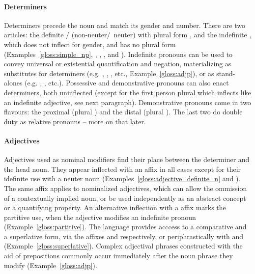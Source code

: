 \paragraph{Determiners}
Determiners precede the noun and match its gender and number.
There are two articles: the definite / (non-neuter/~neuter) with plural form , and the indefinite , which does not inflect for gender, and has no plural form (Examples~\ref{gloss:simple_np}, , , ,  and ).
Indefinite pronouns can be used to convey universal or existential quantification and negation, materializing as substitutes for determiners (e.g. , , , etc., Example~\ref{gloss:adjp}), or as stand-alones (e.g. , , etc.).
Possessive and demonstrative pronouns can also enact determiners, both uninflected (except for the first person plural  which inflects like an indefinite adjective, see next paragraph).
Demonstrative pronouns come in two flavours: the proximal  (plural ) and the distal  (plural ).
The last two do double duty as relative pronouns -- more on that later.

\paragraph{Adjectives}
Adjectives used as nominal modifiers find their place between the determiner and the head noun.
They appear inflected with an  affix in all cases except for their idefinite use with a neuter noun (Examples~\ref{gloss:adjective_definite_n} and ).
The same affix applies to nominalized adjectives, which can allow the ommission of a contextually implied noun, or be used independently as an abstract concept or a quantifying property.
An alternative inflection with a  affix marks the partitive use, when the adjective modifies an indefinite pronoun (Example~\ref{gloss:partitive}).
The language provides acccess to a comparative and a superlative form, via the affixes  and  respectively, or periphrastically with  and  (Example~\ref{gloss:superlative}).
Complex adjectival phrases constructed with the aid of prepositions commonly occur immediately after the noun phrase they modify (Example~\ref{gloss:adjp}).

